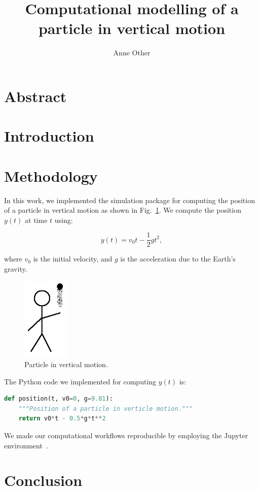 \documentclass[project-plan]{report-template}
\title{Computational modelling of a particle in vertical motion}
\author{Anne Other}
\begin{document}
\maketitlepage  %

\section*{Abstract}
\blindtext  %

\section{Introduction}
\blindtext[2]

\section{Methodology}
In this work, we implemented the simulation package for computing the position of a particle in vertical motion as shown in Fig.~\ref{fig:experiment}. We compute the position $y(t)$ at time $t$ using:

\begin{equation}
    \label{eq:vertical-position}
    y(t) = v_{0}t - \frac{1}{2}gt^{2},
\end{equation}

where $v_{0}$ is the initial velocity, and $g$ is the acceleration due to the Earth's gravity.

\begin{figure}
    \begin{center}
        \includegraphics[width=0.2\textwidth]{experiment.jpg}
    \end{center}
    \caption{\label{fig:experiment} Particle in vertical motion.}
\end{figure}

The Python code we implemented for computing $y(t)$ is:

\begin{lstlisting}[language=Python]
def position(t, v0=0, g=9.81):
    """Position of a particle in verticle motion."""
    return v0*t - 0.5*g*t**2
\end{lstlisting}

We made our computational workflows reproducible by employing the Jupyter environment~\cite{Beg2021}.

\section{Conclusion}
\blindtext[2]


\end{document}
